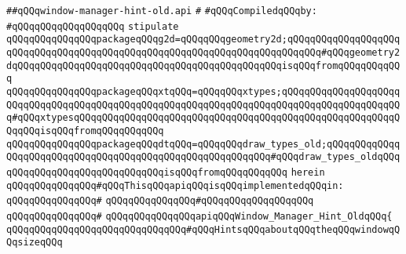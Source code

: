 \label{src/lib/x-kit/xclient/src/iccc/window-manager-hint-old.api}
\verb|##qQQqwindow-manager-hint-old.api|\newline
\verb|#|\newline
\newline
\verb|#qQQqCompiledqQQqby:|\newline
\verb|#qQQqqQQqqQQqqQQqqQQq|\newline
\newline
\verb|stipulate|\newline
\verb|qQQqqQQqqQQqqQQqpackageqQQqg2d=qQQqqQQqgeometry2d;qQQqqQQqqQQqqQQqqQQqqQQqqQQqqQQqqQQqqQQqqQQqqQQqqQQqqQQqqQQqqQQqqQQqqQQqqQQq#qQQqgeometry2dqQQqqQQqqQQqqQQqqQQqqQQqqQQqqQQqqQQqqQQqqQQqqQQqisqQQqfromqQQqqQQqqQQq|\newline
\verb|qQQqqQQqqQQqqQQqpackageqQQqxtqQQq=qQQqqQQqxtypes;qQQqqQQqqQQqqQQqqQQqqQQqqQQqqQQqqQQqqQQqqQQqqQQqqQQqqQQqqQQqqQQqqQQqqQQqqQQqqQQqqQQqqQQqqQQq#qQQqxtypesqQQqqQQqqQQqqQQqqQQqqQQqqQQqqQQqqQQqqQQqqQQqqQQqqQQqqQQqqQQqqQQqisqQQqfromqQQqqQQqqQQq|\newline
\verb|qQQqqQQqqQQqqQQqpackageqQQqdtqQQq=qQQqqQQqdraw_types_old;qQQqqQQqqQQqqQQqqQQqqQQqqQQqqQQqqQQqqQQqqQQqqQQqqQQqqQQqqQQq#qQQqdraw_types_oldqQQqqQQqqQQqqQQqqQQqqQQqqQQqqQQqisqQQqfromqQQqqQQqqQQq|\newline
\verb|herein|\newline
\newline
\verb|qQQqqQQqqQQqqQQq#qQQqThisqQQqapiqQQqisqQQqimplementedqQQqin:|\newline
\verb|qQQqqQQqqQQqqQQq#|\newline
\verb|qQQqqQQqqQQqqQQq#qQQqqQQqqQQqqQQqqQQq|\newline
\verb|qQQqqQQqqQQqqQQq#|\newline
\verb|qQQqqQQqqQQqqQQqapiqQQqWindow_Manager_Hint_OldqQQq{|\newline
\newline
\verb|qQQqqQQqqQQqqQQqqQQqqQQqqQQqqQQq#qQQqHintsqQQqaboutqQQqtheqQQqwindowqQQqsizeqQQq|\newline
